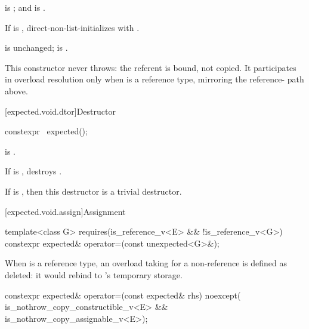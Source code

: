 \begin{itemdescr}
\pnum
\constraints
{} is ; and  is .

\pnum
\effects
If  is , direct-non-list-initializes  with .

\pnum
\ensures
{} is unchanged;  is .

\pnum
\remarks
This constructor never throws: the referent is bound, not copied. It participates in overload resolution only when  is a reference type, mirroring the  reference- path above.
\end{itemdescr}

[expected.void.dtor]{Destructor}

%
\begin{itemdecl}
constexpr ~expected();
\end{itemdecl}

\begin{itemdescr}
\pnum
\constraints
{} is .

\pnum
\effects
If  is , destroys .

\pnum
\remarks
If  is , then this destructor is a trivial destructor.
\end{itemdescr}

[expected.void.assign]{Assignment}

%
\begin{itemdecl}
template<class G>
  requires(is_reference_v<E> && !is_reference_v<G>)
constexpr expected& operator=(const unexpected<G>&);
\end{itemdecl}

\begin{itemdescr}
\pnum
\remarks
When  is a reference type, an overload taking  for a non-reference  is defined as deleted: it would rebind  to 's temporary storage.
\end{itemdescr}

%
\begin{itemdecl}
constexpr expected& operator=(const expected& rhs) noexcept(
    is_nothrow_copy_constructible_v<E> && is_nothrow_copy_assignable_v<E>);
\end{itemdecl}

